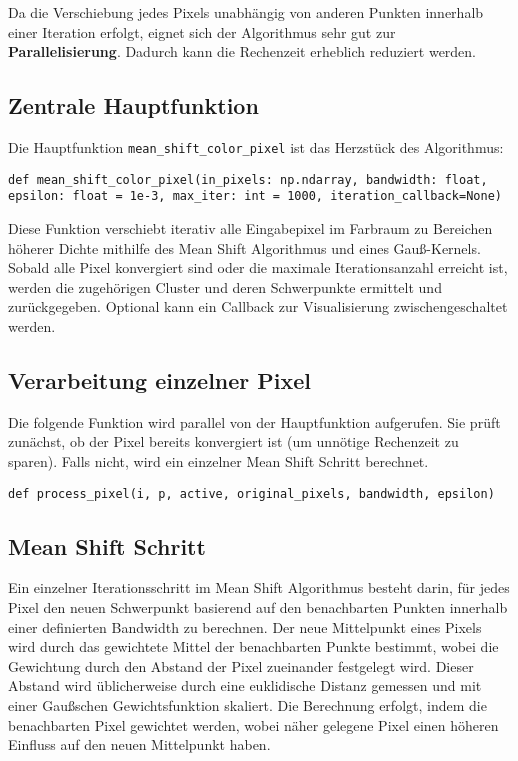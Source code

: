 Da die Verschiebung jedes Pixels unabhängig von anderen Punkten innerhalb einer Iteration erfolgt, eignet sich der Algorithmus sehr gut zur \textbf{Parallelisierung}. Dadurch kann die Rechenzeit erheblich reduziert werden.

\subsection*{Zentrale Hauptfunktion}

Die Hauptfunktion \texttt{mean\_shift\_color\_pixel} ist das Herzstück des Algorithmus:

\begin{verbatim}
def mean_shift_color_pixel(in_pixels: np.ndarray, bandwidth: float, epsilon: float = 1e-3, max_iter: int = 1000, iteration_callback=None)
\end{verbatim}

Diese Funktion verschiebt iterativ alle Eingabepixel im Farbraum zu Bereichen höherer Dichte mithilfe des Mean Shift Algorithmus und eines Gauß-Kernels. Sobald alle Pixel konvergiert sind oder die maximale Iterationsanzahl erreicht ist, werden die zugehörigen Cluster und deren Schwerpunkte ermittelt und zurückgegeben. Optional kann ein Callback zur Visualisierung zwischengeschaltet werden.

\subsection*{Verarbeitung einzelner Pixel}

Die folgende Funktion wird parallel von der Hauptfunktion aufgerufen. Sie prüft zunächst, ob der Pixel bereits konvergiert ist (um unnötige Rechenzeit zu sparen). Falls nicht, wird ein einzelner Mean Shift Schritt berechnet.

\begin{verbatim}
def process_pixel(i, p, active, original_pixels, bandwidth, epsilon)
\end{verbatim}

\subsection*{Mean Shift Schritt}

Ein einzelner Iterationsschritt im Mean Shift Algorithmus besteht darin, für jedes Pixel den neuen Schwerpunkt basierend auf den benachbarten Punkten innerhalb einer definierten Bandwidth zu berechnen. Der neue Mittelpunkt eines Pixels wird durch das gewichtete Mittel der benachbarten Punkte bestimmt, wobei die Gewichtung durch den Abstand der Pixel zueinander festgelegt wird. Dieser Abstand wird üblicherweise durch eine euklidische Distanz gemessen und mit einer Gaußschen Gewichtsfunktion skaliert. Die Berechnung erfolgt, indem die benachbarten Pixel gewichtet werden, wobei näher gelegene Pixel einen höheren Einfluss auf den neuen Mittelpunkt haben.

